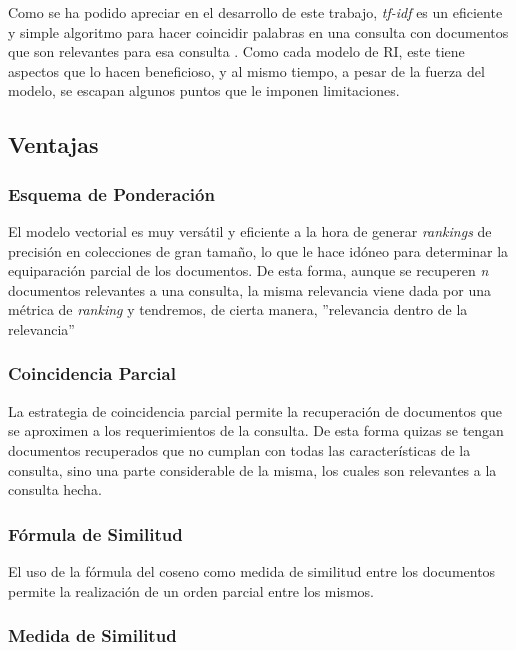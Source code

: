 Como se ha podido apreciar en el desarrollo de este trabajo, \emph{tf-idf} es
un eficiente y simple algoritmo para hacer coincidir palabras en una consulta
con documentos que son relevantes para esa consulta \cite{ramos}. Como cada
modelo de RI, este tiene aspectos que lo hacen beneficioso, y al mismo tiempo,
a pesar de la fuerza del modelo, se escapan algunos puntos que le imponen
limitaciones.

\subsection{Ventajas}

\subsubsection{Esquema de Ponderación}

El modelo vectorial es muy versátil y eficiente a la hora de generar
\emph{rankings} de precisión en colecciones de gran tamaño, lo que le hace
idóneo para determinar la equiparación parcial de los documentos. De esta
forma, aunque se recuperen \emph{n} documentos relevantes a una consulta, la
misma relevancia viene dada por una métrica de \emph{ranking} y tendremos, de
cierta manera, ''relevancia dentro de la relevancia''

\subsubsection{Coincidencia Parcial}

La estrategia de coincidencia parcial permite la recuperación de documentos
que se aproximen a los requerimientos de la consulta. De esta forma quizas se
tengan documentos recuperados que no cumplan con todas las características de
la consulta, sino una parte considerable de la misma, los cuales son relevantes
a la consulta hecha.

\subsubsection{Fórmula de Similitud}

El uso de la fórmula del coseno como medida de similitud entre los documentos
permite la realización de un orden parcial entre los mismos.

\subsubsection{Medida de Similitud}

